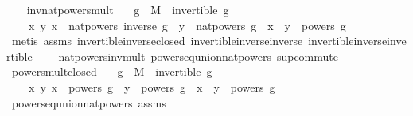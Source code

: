 \begin{isabellebody}
\ \ \isamarkupfalse%
\isanewline
{}\isamarkupfalse%
%
\endisatagproof
{\isafoldproof}%
%
\isadelimproof
\isanewline
%
\endisadelimproof
\isanewline
{}\isamarkupfalse%
\ inv{\isacharunderscore}{\kern0pt}nat{\isacharunderscore}{\kern0pt}powers{\isacharunderscore}{\kern0pt}mult{\isacharcolon}{\kern0pt}\isanewline
\ \ \ {\isachardoublequoteopen}g\ {\isasymin}\ M{\isachardoublequoteclose}\ \ {\isachardoublequoteopen}invertible\ g{\isachardoublequoteclose}\isanewline
\ \ \ {\isachardoublequoteopen}{\isasymAnd}\ x\ y{\isachardot}{\kern0pt}\ x\ {\isasymin}\ nat{\isacharunderscore}{\kern0pt}powers\ {\isacharparenleft}{\kern0pt}inverse\ g{\isacharparenright}{\kern0pt}\ {\isasymLongrightarrow}\ y\ {\isasymin}\ nat{\isacharunderscore}{\kern0pt}powers\ g\ {\isasymLongrightarrow}\ x\ {\isasymcdot}\ y\ {\isasymin}\ powers\ g{\isachardoublequoteclose}\isanewline
%
\isadelimproof
\ \ %
\endisadelimproof
%
\isatagproof
{}\isamarkupfalse%
\ {\isacharparenleft}{\kern0pt}metis\ assms\ invertible{\isacharunderscore}{\kern0pt}inverse{\isacharunderscore}{\kern0pt}closed\ invertible{\isacharunderscore}{\kern0pt}inverse{\isacharunderscore}{\kern0pt}inverse\ invertible{\isacharunderscore}{\kern0pt}inverse{\isacharunderscore}{\kern0pt}invertible\isanewline
\ \ \ \ nat{\isacharunderscore}{\kern0pt}powers{\isacharunderscore}{\kern0pt}inv{\isacharunderscore}{\kern0pt}mult\ powers{\isacharunderscore}{\kern0pt}eq{\isacharunderscore}{\kern0pt}union{\isacharunderscore}{\kern0pt}nat{\isacharunderscore}{\kern0pt}powers\ sup{\isacharunderscore}{\kern0pt}commute{\isacharparenright}{\kern0pt}%
\endisatagproof
{\isafoldproof}%
%
\isadelimproof
\isanewline
%
\endisadelimproof
\isanewline
{}\isamarkupfalse%
\ powers{\isacharunderscore}{\kern0pt}mult{\isacharunderscore}{\kern0pt}closed{\isacharcolon}{\kern0pt}\isanewline
\ \ \ {\isachardoublequoteopen}g\ {\isasymin}\ M{\isachardoublequoteclose}\ \ {\isachardoublequoteopen}invertible\ g{\isachardoublequoteclose}\isanewline
\ \ \ {\isachardoublequoteopen}{\isasymAnd}\ x\ y{\isachardot}{\kern0pt}\ x\ {\isasymin}\ powers\ g\ {\isasymLongrightarrow}\ y\ {\isasymin}\ powers\ g\ {\isasymLongrightarrow}\ x\ {\isasymcdot}\ y\ {\isasymin}\ powers\ g{\isachardoublequoteclose}\isanewline
%
\isadelimproof
\ \ %
\endisadelimproof
%
\isatagproof
{}\isamarkupfalse%
\ powers{\isacharunderscore}{\kern0pt}eq{\isacharunderscore}{\kern0pt}union{\isacharunderscore}{\kern0pt}nat{\isacharunderscore}{\kern0pt}powers\ assms\ \isanewline

\end{isabellebody}

